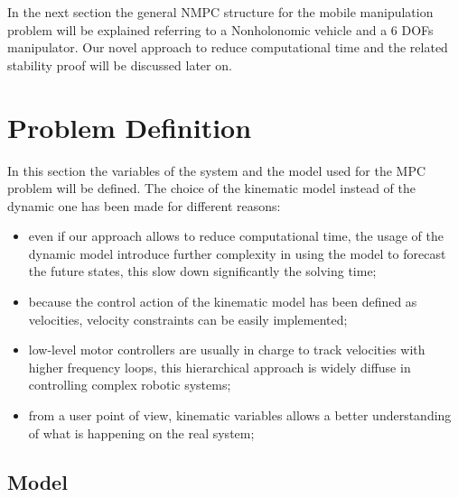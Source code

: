 In the next section the general NMPC structure for the mobile manipulation problem will be explained referring to a Nonholonomic vehicle and a 6 DOFs manipulator. Our novel approach to reduce computational time and the related stability proof will be discussed later on.

\section{Problem Definition}

In this section the variables of the system and the model used for the MPC problem will be defined. The choice of the kinematic model instead of the dynamic one has been made for different reasons:

\begin{itemize}
\item even if our approach allows to reduce computational time, the usage of the dynamic model introduce further complexity in using the model to forecast the future states, this slow down significantly the solving time;
\item because the control action of the kinematic model has been defined as velocities, velocity constraints can be easily implemented;
\item low-level motor controllers are usually in charge to track velocities with higher frequency loops, this hierarchical approach is widely diffuse in controlling complex robotic systems;
\item from a user point of view, kinematic variables allows a better understanding of what is happening on the real system;
\end{itemize}

\subsection{Model}

